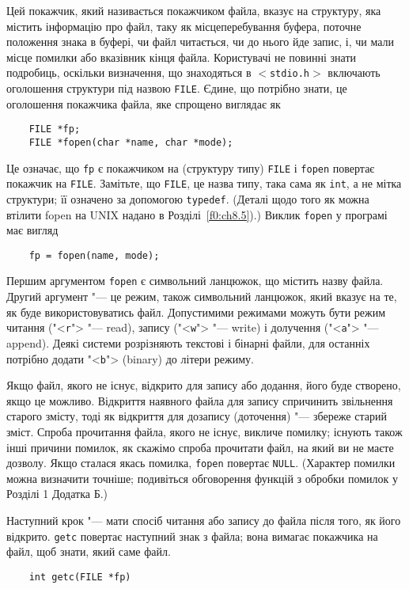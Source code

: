 \documentclass[a4paper,12pt]{book}
\begin{document}
  Цей покажчик, який називається покажчиком файла, вказує на структуру, яка містить
  інформацію про файл, таку як місцеперебування буфера, поточне положення знака в буфері,
  чи файл читається, чи до нього йде запис, і, чи мали місце помилки або вказівник кінця
  файла. Користувачі не повинні знати подробиць, оскільки визначення, що знаходяться в
  \texttt{\mbox{$<$}stdio.h\mbox{$>$}} включають оголошення структури під назвою
  \texttt{FILE}. Єдине, що потрібно знати, це оголошення покажчика файла, яке спрощено
  виглядає як
  \begin{verbatim}
    FILE *fp;
    FILE *fopen(char *name, char *mode);
  \end{verbatim}

  Це означає, що \texttt{fp} є покажчиком на (структуру типу) \texttt{FILE} і
  \texttt{fopen} повертає покажчик на \texttt{FILE}. Замітьте, що \texttt{FILE}, це назва
  типу, така сама як \texttt{int}, а не мітка структури; її означено за допомогою
  \texttt{typedef}. (Деталі щодо того як можна втілити fopen на UNIX надано в 
  Розділі~\ref{f0:ch8.5}).) Виклик \texttt{fopen} у програмі має вигляд
  \begin{verbatim}
    fp = fopen(name, mode);
  \end{verbatim}

  Першим аргументом \texttt{fopen} є символьний ланцюжок, що містить назву файла. Другий
  аргумент "--- це режим, також символьний ланцюжок, який вказує на те, як буде
  використовуватись файл. Допустимими режимами можуть бути режим читання ("<\texttt{r}"> 
  "--- read), запису ("<\texttt{w}"> "--- write) і
  долучення ("<\texttt{a}"> "--- append). Деякі системи розрізняють текстові
  і бінарні файли, для останніх потрібно додати "<\texttt{b}"> (binary) до
  літери режиму.

  Якщо файл, якого не існує, відкрито для запису або додання, його буде створено, якщо це
  можливо. Відкриття наявного файла для запису спричинить звільнення старого змісту, тоді
  як відкриття для дозапису (доточення) "--- збереже старий зміст. Спроба прочитання
  файла, якого не існує, викличе помилку; існують також інші причини помилок, як скажімо
  спроба прочитати файл, на який ви не маєте дозволу. Якщо сталася якась помилка,
  \texttt{fopen} повертає \texttt{NULL}. (Характер помилки можна визначити точніше;
  подивіться обговорення функцій з обробки помилок у Розділі 1 Додатка
  Б.)

  Наступний крок "--- мати спосіб читання або запису до файла після того, як його
  відкрито. \texttt{getc} повертає наступний знак з файла; вона вимагає покажчика на файл,
  щоб знати, який саме файл.
  \begin{verbatim}
    int getc(FILE *fp)
  \end{verbatim}
\end{document}
